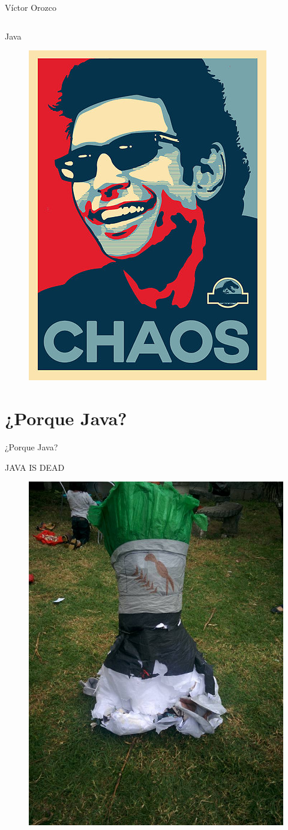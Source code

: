\documentclass{beamer}
\begin{document}
\begin{frame}{Víctor Orozco}
\begin{columns}[T]
\begin{column}[T]{5cm}
        \end{column}
    \end{columns}
\end{frame}

\begin{frame}{Java}
	\begin{figure}
		\centering
		\includegraphics[width=0.5\linewidth]{Images/chaos}
	\end{figure}
\end{frame}


\section{¿Porque Java?}
\begin{frame}
	\huge ¿Porque Java?
\end{frame}

\begin{frame}
	JAVA IS DEAD
\begin{figure}
	\centering
	\includegraphics[width=0.5\linewidth]{Images/dukedead.jpg}
\end{figure}
\end{frame}
\end{document}
